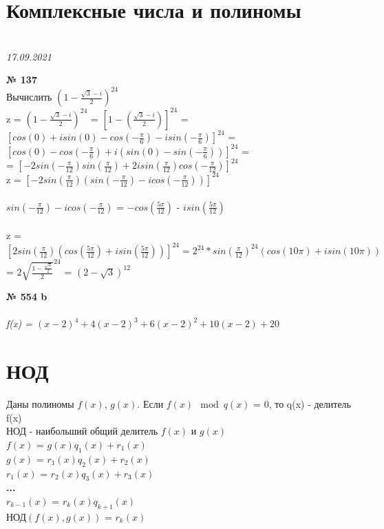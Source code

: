 \documentclass[12pt]{article}
\newenvironment{task}[1][0]{\vspace{.5cm} {\textbf{№ #1} \vspace{.5cm}\\ }}{\\}
\begin{document}
\section{Комплексные числа и полиномы}
	{\\ 
	\hfill \textit{17.09.2021}\\ \vspace{1cm}}

\begin{task}[137]
	{\large Вычислить $(1-\frac{\sqrt{3}-i}{2})^{24}$}\\
	z = {$(1-\frac{\sqrt{3}-i}{2})^{24}$ = $[1 - (\frac{\sqrt{3}-i}{2})]^{24}$ = $[cos(0)+isin(0)-cos(-\frac{\pi}{6})-isin(-\frac{\pi}{6})]^{24}$ = $[cos(0)-cos(-\frac{\pi}{6}) + i(sin(0) - sin(-\frac{\pi}{6}))]^{24}$ =\\= $[-2sin(-\frac{\pi}{12})sin(\frac{\pi}{12}) + 2isin(\frac{\pi}{12})cos(-\frac{\pi}{12})]^{24}$}\\
	z = $[-2sin(\frac{\pi}{12})(sin(-\frac{\pi}{12})-icos(-\frac{\pi}{12}))]^{24}$\\\\
	$sin(-\frac{\pi}{12})-icos(-\frac{\pi}{12})$ = $-cos(\frac{5\pi}{12})$ - $isin(\frac{5\pi}{12})$\\\\
	z = $[2sin(\frac{\pi}{12})(cos(\frac{5\pi}{12}) + isin(\frac{5\pi}{12}))]^{24}=2^{24}*sin(\frac{\pi}{12})^{24}(cos(10\pi)+isin(10\pi))$ = $2\sqrt{\frac{1-\frac{\sqrt{3}}{2}}{2}}^{24}$ = $(2-\sqrt{3})^{12}$
\end{task}

\vspace{1cm}
{
{\textbf{№ 554 b}\\ \vspace{.25cm}\\}
\textit{f(x) = $(x-2)^4+4(x-2)^3+6(x-2)^2+10(x-2)+20$}

}
\newpage
\section{НОД}
Даны полиномы $f(x)$, $g(x)$. Если $f(x)\mod{q(x)}$ = 0, то q(x) - делитель f(x)\\
НОД - наибольший общий делитель $f(x)$ и $g(x)$\\
$f(x)$ = $g(x)q_1(x)+r_1(x)$\\
$g(x)$ = $r_1(x)q_2(x)+r_2(x)$\\
$r_1(x)$ = $r_2(x)q_3(x)+r_3(x)$\\
\textbf{...}\\
$r_{k-1}(x)$ = $r_k(x)q_{k+1}(x)$\\
НОД$(f(x), g(x))$ = $r_k(x)$
\end{document}
